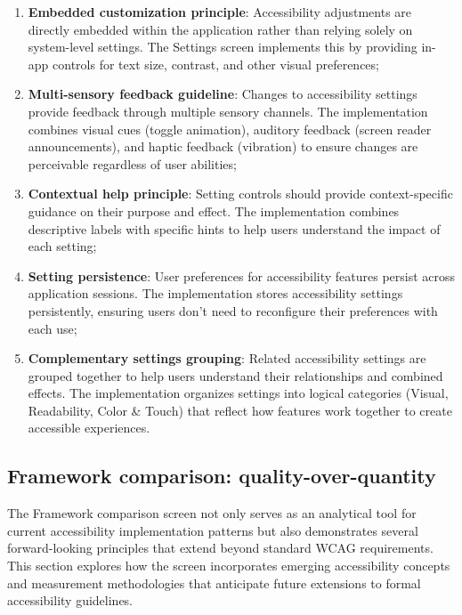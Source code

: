 \begin{enumerate}
    \item \textbf{Embedded customization principle}: Accessibility adjustments are directly embedded within the application rather than relying solely on system-level settings. The Settings screen implements this by providing in-app controls for text size, contrast, and other visual preferences;
    
    \item \textbf{Multi-sensory feedback guideline}: Changes to accessibility settings provide feedback through multiple sensory channels. The implementation combines visual cues (toggle animation), auditory feedback (screen reader announcements), and haptic feedback (vibration) to ensure changes are perceivable regardless of user abilities;
    
    \item \textbf{Contextual help principle}: Setting controls should provide context-specific guidance on their purpose and effect. The implementation combines descriptive labels with specific hints to help users understand the impact of each setting;
    
    \item \textbf{Setting persistence}: User preferences for accessibility features persist across application sessions. The implementation stores accessibility settings persistently, ensuring users don't need to reconfigure their preferences with each use;
    
    \item \textbf{Complementary settings grouping}: Related accessibility settings are grouped together to help users understand their relationships and combined effects. The implementation organizes settings into logical categories (Visual, Readability, Color \& Touch) that reflect how features work together to create accessible experiences.
\end{enumerate}

\subsection{Framework comparison: quality-over-quantity}

The Framework comparison screen not only serves as an analytical tool for current accessibility implementation patterns but also demonstrates several forward-looking principles that extend beyond standard WCAG requirements. This section explores how the screen incorporates emerging accessibility concepts and measurement methodologies that anticipate future extensions to formal accessibility guidelines.


